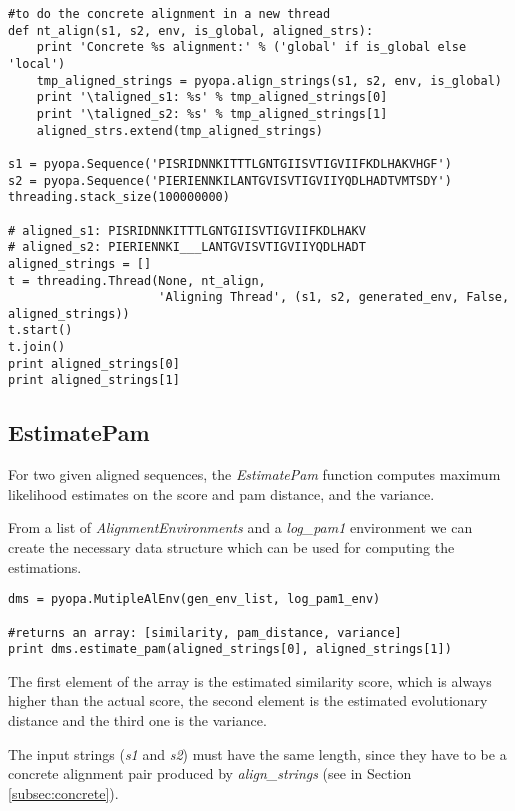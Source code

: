 \documentclass[12pt]{article}
\begin{document}
\begin{lstlisting}
#to do the concrete alignment in a new thread
def nt_align(s1, s2, env, is_global, aligned_strs):
    print 'Concrete %s alignment:' % ('global' if is_global else 'local')
    tmp_aligned_strings = pyopa.align_strings(s1, s2, env, is_global)
    print '\taligned_s1: %s' % tmp_aligned_strings[0]
    print '\taligned_s2: %s' % tmp_aligned_strings[1]
    aligned_strs.extend(tmp_aligned_strings)

s1 = pyopa.Sequence('PISRIDNNKITTTLGNTGIISVTIGVIIFKDLHAKVHGF')
s2 = pyopa.Sequence('PIERIENNKILANTGVISVTIGVIIYQDLHADTVMTSDY')
threading.stack_size(100000000)

# aligned_s1: PISRIDNNKITTTLGNTGIISVTIGVIIFKDLHAKV
# aligned_s2: PIERIENNKI___LANTGVISVTIGVIIYQDLHADT
aligned_strings = []
t = threading.Thread(None, nt_align,
                     'Aligning Thread', (s1, s2, generated_env, False, aligned_strings))
t.start()
t.join()
print aligned_strings[0]
print aligned_strings[1]
\end{lstlisting}

\subsection{EstimatePam}
\label{subsec:EPam}

For two given aligned sequences, the \emph{EstimatePam} function computes maximum likelihood estimates on the score and pam distance, and the variance. 

From a list of \emph{AlignmentEnvironments} and a \emph{log\_pam1} environment we can create the necessary data structure which can be used for computing the estimations.

\begin{lstlisting}
dms = pyopa.MutipleAlEnv(gen_env_list, log_pam1_env)

#returns an array: [similarity, pam_distance, variance]
print dms.estimate_pam(aligned_strings[0], aligned_strings[1])

\end{lstlisting}

The first element of the array is the estimated similarity score, which is always higher than the actual score, the second element is the estimated evolutionary distance and the third one is the variance.

The input strings (\emph{s1} and \emph{s2}) must have the same length, since they have to be a concrete alignment pair produced by \emph{align\_strings} (see in Section \ref{subsec:concrete}).
\end{document}
